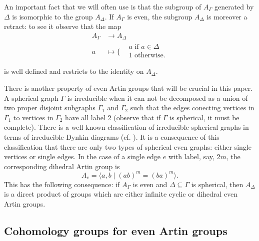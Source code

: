\documentclass[10pt, oneside]{amsart}
\theoremstyle{definition}
\theoremstyle{remark}
\theoremstyle{plain}
\begin{document}
An important fact that we will often use is that the subgroup of $A_\Gamma$ generated by $\Delta$ is isomorphic to the group $A_\Delta$. If $A_\Gamma$ is even, the subgroup $A_\Delta$ is moreover a retract: to see it observe that the map 
$$\begin{aligned}
    A_\Gamma&\to A_\Delta\\
    a&\mapsto\Big\{\begin{aligned}
        &a\text{ if }a\in\Delta\\
        &1\text{ otherwise}.\\
    \end{aligned}\\
\end{aligned}$$
is well defined and restricts to the identity on $A_\Delta$.

There is another property of even Artin groups that will be crucial in this paper. A spherical graph $\Gamma$ is irreducible when it can not be decomposed as a union of two proper disjoint subgraphs $\Gamma_1$ and $\Gamma_2$ such that the edges conecting vertices in $\Gamma_1$ to vertices in $\Gamma_2$ have all label 2 (observe that if $\Gamma$ is spherical, it must be complete). There is a well known classification of irreducible spherical graphs in terms of irreducible Dynkin diagrams (cf. \cite{Coxeter 1935}). It is a consequence of this classification that there are only two types of spherical even graphs: either single vertices or single edges. In the case of a single edge $e$ with label, say, $2m$, the corresponding dihedral Artin group is
$$A_e=\langle a,b\mid (ab)^m=(ba)^m\rangle.$$
This has the following consequence: if $A_\Gamma$ is even and $\Delta\subseteq\Gamma$ is spherical, then $A_\Delta$ is a direct product of groups which are either infinite cyclic or dihedral even Artin groups.



\subsection{Cohomology groups for even Artin groups}
\end{document}
